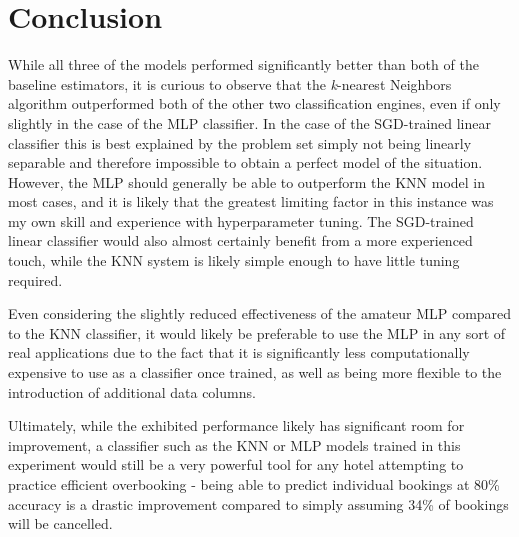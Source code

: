 \documentclass[10pt,conference]{IEEEtran}
\begin{document}
\section{Conclusion}
  While all three of the models performed significantly better than both of the baseline estimators, it is curious to observe that the \emph{k}-nearest Neighbors algorithm outperformed both of the other two classification engines, even if only slightly in the case of the MLP classifier. In the case of the SGD-trained linear classifier this is best explained by the problem set simply not being linearly separable and therefore impossible to obtain a perfect model of the situation. However, the MLP should generally be able to outperform the KNN model in most cases, and it is likely that the greatest limiting factor in this instance was my own skill and experience with hyperparameter tuning. The SGD-trained linear classifier would also almost certainly benefit from a more experienced touch, while the KNN system is likely simple enough to have little tuning required.

  Even considering the slightly reduced effectiveness of the amateur MLP compared to the KNN classifier, it would likely be preferable to use the MLP in any sort of real applications due to the fact that it is significantly less computationally expensive to use as a classifier once trained, as well as being more flexible to the introduction of additional data columns. 

  Ultimately, while the exhibited performance likely has significant room for improvement, a classifier such as the KNN or MLP models trained in this experiment would still be a very powerful tool for any hotel attempting to practice efficient overbooking - being able to predict individual bookings at 80\% accuracy is a drastic improvement compared to simply assuming 34\% of bookings will be cancelled.

\nocite{*}




\vspace{12pt}
\end{document}
